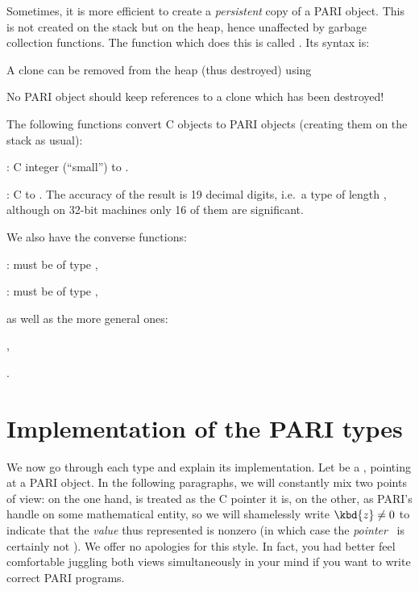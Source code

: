 \label{se:clone}
Sometimes, it is more efficient to create a \emph{persistent} copy of a PARI
object. This is not created on the stack but on the heap, hence unaffected by
garbage collection functions. The function which does this is called
. Its syntax is:


A clone can be removed from the heap (thus destroyed) using


\noindent No PARI object should keep references to a clone which has been
destroyed!

The following functions convert C objects to PARI objects (creating them on
the stack as usual):

: C  integer  (``small'') to .

: C  to . The accuracy of
the result is 19 decimal digits, i.e.~a type  of length
, although on 32-bit machines only 16 of them are
significant.

\noindent We also have the converse functions:

:  must be of type ,

:  must be of type ,

\noindent as well as the more general ones:

,

.

\section{Implementation of the PARI types}
\label{se:impl}

\noindent
We now go through each type and explain its implementation. Let  be a
, pointing at a PARI object. In the following paragraphs, we will
constantly mix two points of view: on the one hand,  is treated as the
C pointer it is, on the other, as PARI's handle on some mathematical entity,
so we will shamelessly write $\kbd{z} \ne 0$ to indicate that the
\emph{value} thus represented is nonzero (in which case the
\emph{pointer}~ is certainly not ). We offer no apologies
for this style. In fact, you had better feel comfortable juggling both views
simultaneously in your mind if you want to write correct PARI programs.

